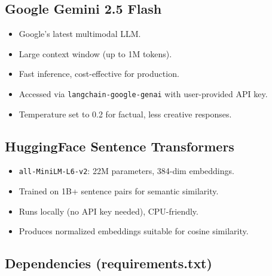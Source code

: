 \documentclass[12pt,a4paper]{article}
\begin{document}
\subsection{Google Gemini 2.5 Flash}
\begin{itemize}
  \item Google's latest multimodal LLM.
  \item Large context window (up to 1M tokens).
  \item Fast inference, cost-effective for production.
  \item Accessed via \texttt{langchain-google-genai} with user-provided API key.
  \item Temperature set to 0.2 for factual, less creative responses.
\end{itemize}

\subsection{HuggingFace Sentence Transformers}
\begin{itemize}
  \item \texttt{all-MiniLM-L6-v2}: 22M parameters, 384-dim embeddings.
  \item Trained on 1B+ sentence pairs for semantic similarity.
  \item Runs locally (no API key needed), CPU-friendly.
  \item Produces normalized embeddings suitable for cosine similarity.
\end{itemize}

\subsection{Dependencies (requirements.txt)}
\end{document}
